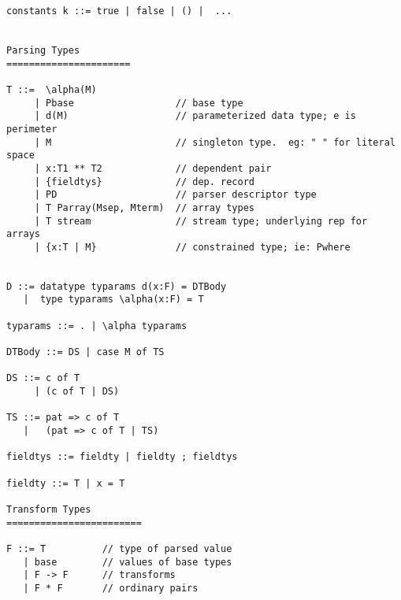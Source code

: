 {\small
\begin{verbatim}
constants k ::= true | false | () |  ...


Parsing Types
======================

T ::=  \alpha(M)
     | Pbase                  // base type
     | d(M)                   // parameterized data type; e is perimeter
     | M                      // singleton type.  eg: " " for literal space
     | x:T1 ** T2             // dependent pair
     | {fieldtys}             // dep. record
     | PD                     // parser descriptor type
     | T Parray(Msep, Mterm)  // array types
     | T stream               // stream type; underlying rep for arrays
     | {x:T | M}              // constrained type; ie: Pwhere


D ::= datatype typarams d(x:F) = DTBody
   |  type typarams \alpha(x:F) = T

typarams ::= . | \alpha typarams

DTBody ::= DS | case M of TS

DS ::= c of T
     | (c of T | DS)

TS ::= pat => c of T
   |   (pat => c of T | TS)

fieldtys ::= fieldty | fieldty ; fieldtys

fieldty ::= T | x = T

Transform Types
========================

F ::= T          // type of parsed value
   | base        // values of base types
   | F -> F      // transforms
   | F * F       // ordinary pairs
\end{verbatim}
}
